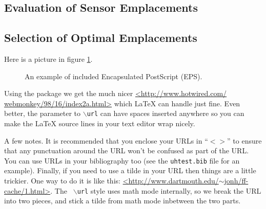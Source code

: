 \subsection{Evaluation of Sensor Emplacements}
\subsection{Selection of Optimal Emplacements}


Here is a picture in figure \ref{fig:example-1}.

\begin{figure}[htbp]
  \centering
  \caption{An example of included Encapsulated PostScript (EPS).}
  \label{fig:example-1}
\end{figure}

Using the package we get the much nicer \url{<http://www.hotwired.com/
webmonkey/98/16/index2a.html>} which LaTeX can handle just fine. Even better,
the parameter to {\tt $\backslash$url} can have spaces inserted anywhere so you
can make the LaTeX source lines in your text editor wrap nicely.

A few notes. It is recommended that you enclose your URLs in ``$<>$'' to ensure
that any punctuation around the URL won't be confused as part of the URL. You
can use URLs in your bibliography too (see the {\tt uhtest.bib} file for an
example). Finally, if you need to use a tilde in your URL then things are a
little trickier. One way to do it is like this:
\url{<http://www.dartmouth.edu/}$\sim$\url{jonh/ff-cache/1.html>}. The {\tt
$\backslash$url} style uses math mode internally, so we break the URL into two
pieces, and stick a tilde from math mode inbetween the two parts.

